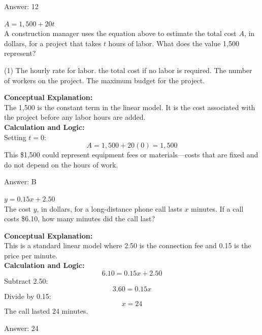 \documentclass[11pt,paper=a4,answers]{exam}
\begin{document}
\begin{questions}
\begin{solution}
\vspace{15pt}
Answer: \colorbox{yellow!100}{12}
\end{solution}

\question
$A = 1,500 + 20t$ \\
A construction manager uses the equation above to estimate the total cost $A$, in dollars, for a project that takes $t$ hours of labor. What does the value 1,500 represent?
\begin{tasks}(1)
    \task The hourly rate for labor.
    \task the total cost if no labor is required.
    \task The number of workers on the project.
    \task The maximum budget for the project.
\end{tasks}

\begin{solution}
\textbf{Conceptual Explanation:} \\
The 1,500 is the constant term in the linear model. It is the cost associated with the project before any labor hours are added.
\\[10pt]
\textbf{Calculation and Logic:} \\
Setting $t = 0$:
\[A = 1,500 + 20(0) = 1,500\]
This \$1,500 could represent equipment fees or materials—costs that are fixed and do not depend on the hours of work.

\vspace{15pt}
Answer: \colorbox{yellow!100}{B}
\end{solution}

\question
$y = 0.15x + 2.50$ \\
The cost $y$, in dollars, for a long-distance phone call lasts $x$ minutes. If a call costs \$6.10, how many minutes did the call last?

\begin{solution}
\textbf{Conceptual Explanation:} \\
This is a standard linear model where 2.50 is the connection fee and 0.15 is the price per minute.
\\[10pt]
\textbf{Calculation and Logic:} \\
\[6.10 = 0.15x + 2.50\]
Subtract 2.50:
\[3.60 = 0.15x\]
Divide by 0.15:
\[x = 24\]
The call lasted 24 minutes.

\vspace{15pt}
Answer: \colorbox{yellow!100}{24}
\end{solution}


\end{questions}
\end{document}
